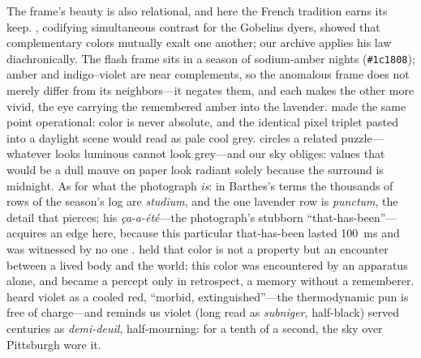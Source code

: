 \documentclass[11pt,a4paper]{article}
\newcommand{\code}[1]{\texttt{\small #1}}
\begin{document}
The frame's beauty is also relational, and here the French tradition earns its
keep. \citet{chevreul1839}, codifying simultaneous contrast for the Gobelins
dyers, showed that complementary colors mutually exalt one another; our
archive applies his law diachronically. The flash frame sits in a season of
sodium-amber nights (\code{\#1c1808}); amber and indigo--violet are near
complements, so the anomalous frame does not merely differ from its
neighbors---it negates them, and each makes the other more vivid, the eye
carrying the remembered amber into the lavender. \citet{albers1963} made the
same point operational: color is never absolute, and the identical pixel
triplet pasted into a daylight scene would read as pale cool grey.
\citet{wittgenstein1977} circles a related puzzle---whatever looks luminous
cannot look grey---and our sky obliges: values that would be a dull mauve on
paper look radiant solely because the surround is midnight. As for what the
photograph \emph{is}: in Barthes's terms the thousands of rows of the season's
log are \emph{studium}, and the one lavender row is \emph{punctum}, the detail
that pierces; his \emph{\c{c}a-a-\'et\'e}---the photograph's stubborn
``that-has-been''---acquires an edge here, because this particular
that-has-been lasted 100~ms and was witnessed by no one \citep{barthes1980}.
\citet{merleauponty1945} held that color is not a property but an encounter
between a lived body and the world; this color was encountered by an apparatus
alone, and became a percept only in retrospect, a memory without a rememberer.
\citet{kandinsky1911} heard violet as a cooled red, ``morbid,
extinguished''---the thermodynamic pun is free of charge---and
\citet{pastoureau2000,pastoureau2008} reminds us violet (long read as
\emph{subniger}, half-black) served centuries as \emph{demi-deuil},
half-mourning: for a tenth of a second, the sky over Pittsburgh wore it.
\end{document}
